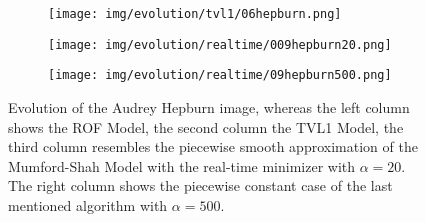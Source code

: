\begin{figure}[ht]
\begin{center}
        \begin{subfigure}[b]{0.21\textwidth}
            \texttt{[image: img/evolution/tvl1/06hepburn.png]}
        \end{subfigure}
        \begin{subfigure}[b]{0.21\textwidth}
            \texttt{[image: img/evolution/realtime/009hepburn20.png]}
        \end{subfigure}
        \begin{subfigure}[b]{0.21\textwidth}
            \texttt{[image: img/evolution/realtime/09hepburn500.png]}
        \end{subfigure}
    \end{center}
    \caption{Evolution of the Audrey Hepburn image, whereas the left column shows the ROF Model, the second column the TVL1 Model, the third column resembles the piecewise smooth approximation of the Mumford-Shah Model with the real-time minimizer with $\alpha = 20$. The right column shows the piecewise constant case of the last mentioned algorithm with $\alpha = 500$.}
\end{figure}